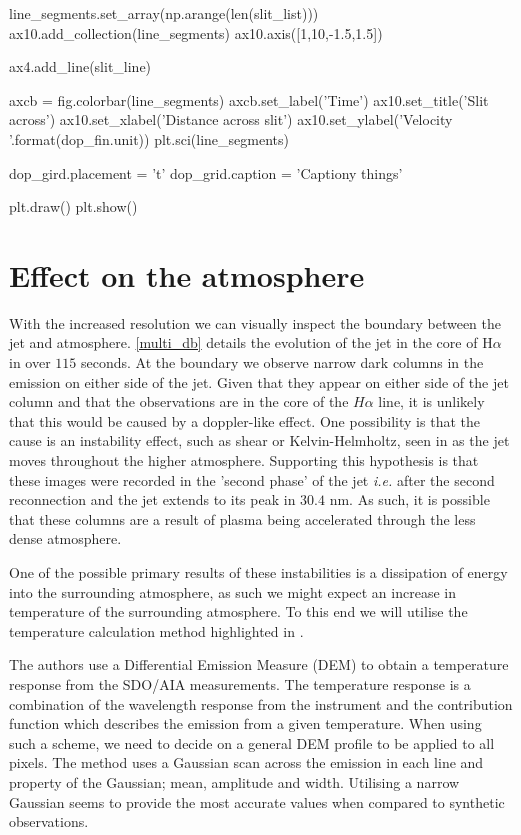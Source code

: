 \documentclass{emulateapj}
\begin{document}
\begin{pycode}[doppler]
line_segments.set_array(np.arange(len(slit_list)))
ax10.add_collection(line_segments)
ax10.axis([1,10,-1.5,1.5])

ax4.add_line(slit_line)

axcb = fig.colorbar(line_segments)
axcb.set_label('Time')
ax10.set_title('Slit across')
ax10.set_xlabel('Distance across slit')
ax10.set_ylabel('Velocity {}'.format(dop_fin.unit))
plt.sci(line_segments)

dop_gird.placement = 't'
dop_grid.caption = 'Captiony things'


plt.draw()
plt.show()

\end{pycode}











\section{Effect on the atmosphere}
\label{temp_map_sect}

With the increased resolution we can visually inspect the boundary between the jet and atmosphere.
\cref{multi_db} details the evolution of the jet in the core of H$\alpha$ in over $115$ seconds.
At the boundary we observe narrow dark columns in the emission on either side of the jet.
Given that they appear on either side of the jet column and that the observations are in the core of the $H\alpha$ line, it is unlikely that this would be caused by a doppler-like effect.
One possibility is that the cause is an instability effect, such as shear or Kelvin-Helmholtz, seen in \cite{Zaqarashvili2014} as the jet moves throughout the higher atmosphere.
Supporting this hypothesis is that these images were recorded in the 'second phase' of the jet \emph{i.e.} after the second reconnection and the jet extends to its peak in $30.4$ nm. 
As such, it is possible that these columns are a result of plasma being accelerated through the less dense atmosphere.

One of the possible primary results of these instabilities is a dissipation of energy into the surrounding atmosphere, as such we might expect an increase in temperature of the surrounding atmosphere.
To this end we will utilise the temperature calculation method highlighted in \cite{Leonard2014}.

The authors use a Differential Emission Measure (DEM) to obtain a temperature response from the SDO/AIA measurements.
The temperature response is a combination of the wavelength response from the instrument and the contribution function which describes the emission from a given temperature.
When using such a scheme, we need to decide on a general DEM profile to be applied to all pixels.
The method uses a Gaussian scan across the emission in each line and property of the Gaussian; mean, amplitude and width. 
Utilising a narrow Gaussian seems to provide the most accurate values when compared to synthetic observations.
\end{document}

